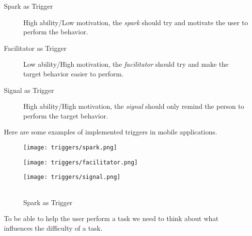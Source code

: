 \begin{description}
  \item[Spark as Trigger] High ability/Low motivation, the \textit{spark} should try and motivate the user to perform the behavior.
  \item[Facilitator as Trigger] Low ability/High motivation, the \textit{facilitator} should try and make the target behavior easier to perform.
  \item[Signal as Trigger]  High ability/High motivation, the \textit{signal} should only remind the person to perform the target behavior.
\end{description}

Here are some examples of implemented triggers in mobile applications.

\begin{figure}
\centering
\captionsetup{format=multiline,font=footnotesize}
\begin{minipage}{.33333\textwidth}
  \centering
  \texttt{[image: triggers/spark.png]}%
  \caption{\\Spark as Trigger}
  \label{fig:spark}
\end{minipage}%
\begin{minipage}{.33333\textwidth}
  \centering
  \texttt{[image: triggers/facilitator.png]}%
  \label{fig:facilitator}
\end{minipage}%
\begin{minipage}{.33333\textwidth}
  \centering
  \texttt{[image: triggers/signal.png]}%
  \label{fig:signal}
\end{minipage}
\end{figure}

To be able to help the user perform a task we need to think about what influences the difficulty of a task.

